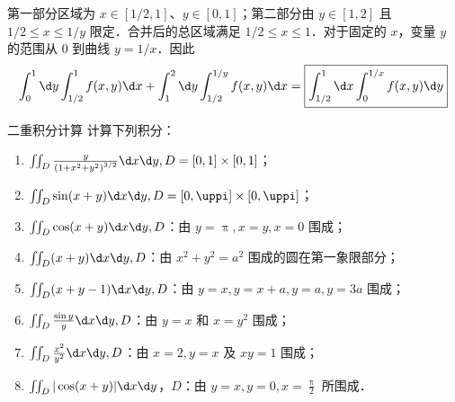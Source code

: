 \begin{solution}
\begin{center}
    \end{center}

    第一部分区域为 $x \in [1/2, 1]$、$y \in [0, 1]$；第二部分由 $y \in [1, 2]$ 且 $1/2 \le x \le 1/y$ 限定．合并后的总区域满足 $1/2 \le x \le 1$．对于固定的 $x$，变量 $y$ 的范围从 $0$ 到曲线 $y = 1/x$．因此
    \begin{equation}
        \int_{0}^{1} \d y \int_{1/2}^{1} f(x, y) \d x + \int_{1}^{2} \d y \int_{1/2}^{1/y} f(x, y) \d x = \boxed{\int_{1/2}^{1} \d x \int_{0}^{1/x} f(x, y) \d y}
    \end{equation}
\end{solution}


\begin{problem}{二重积分计算}{}
    计算下列积分：
    \begin{enumerate}
        \item $\iint_{D} \frac{y}{\left(1+x^{2}+y^{2}\right)^{3 / 2}} \d x \d y, D=[0,1] \times [0,1]$；
        \item $\iint_{D} \sin (x+y) \d x \d y, D=[0, \uppi] \times [0,\uppi]$；
        \item $\iint_{D} \cos (x+y) \d x \d y, D$：由 $y=\uppi, x=y, x=0$ 围成；
        \item $\iint_{D}(x+y) \d x \d y, D$：由 $x^{2}+y^{2}=a^{2}$ 围成的圆在第一象限部分；
        \item $\iint_{D}(x+y-1) \d x \d y, D$：由 $y=x, y=x+a, y=a, y=3 a$ 围成；
        \item $\iint_{D} \frac{\sin y}{y} \d x \d y, D$：由 $y=x$ 和 $x=y^{2}$ 围成；
        \item $\iint_{D} \frac{x^{2}}{y^{2}} \d x \d y, D$：由 $x=2, y=x$ 及 $x y=1$ 围成；
        \item $\iint_{D}|\cos (x+y)| \d x \d y$，$D$：由 $y=x, y=0, x=\frac{\uppi}{2}$ 所围成．
    \end{enumerate}
\end{problem}

